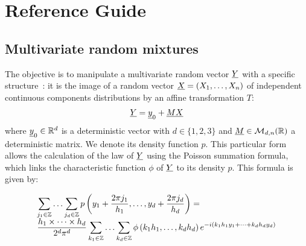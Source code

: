 



\section{Reference Guide}

\subsection{Multivariate random mixtures}

The objective is to manipulate a multivariate random vector ${\underline{Y}}$ with a specific structure~: 
it is the image of a random vector ${\underline{X}} = (X_1, \hdots, X_n) $ of independent continuous components distributions by an affine transformation $T$:
\begin{align}\label{defY}
  {\underline{Y}}={\underline{y}}_0+{\underline{M}}{\underline{X}}
\end{align}
where ${\underline{y}}_0\in\mathbb{R}^d$ is a deterministic vector with $d\in\{1,2,3\}$ and ${\underline{M}}\in\mathcal{M}_{d,n}(\mathbb{R})$ 
a deterministic matrix.
We denote its density function $p$. This particular form allows the calculation of the law of ${\underline{Y}} $ using the Poisson summation formula, which links the characteristic 
function $\phi $ of ${\underline{Y}}$ to its density $p$. This formula is given by:

\begin{align}\label{poissonND}
  \begin{array}{p{\textwidth}}
    \multicolumn{1}{l}{\displaystyle\sum_{j_1\in\mathbb{Z}}\hdots\sum_{j_d\in\mathbb{Z}}p\left(y_1+\frac{2\pi j_1}{h_1},\hdots,y_d+\frac{2\pi j_d}{h_d}\right)= }\\
    \multicolumn{1}{r}{\displaystyle\frac{h_1\times\cdots\times h_d}{2^d\pi^d}\sum_{k_1\in\mathbb{Z}}\hdots\sum_{k_d\in\mathbb{Z}}\phi\left(k_1h_1,\hdots,k_dh_d\right)e^{-i(k_1h_1y_1+\cdots+k_dh_dy_d)}}
  \end{array}
\end{align}

